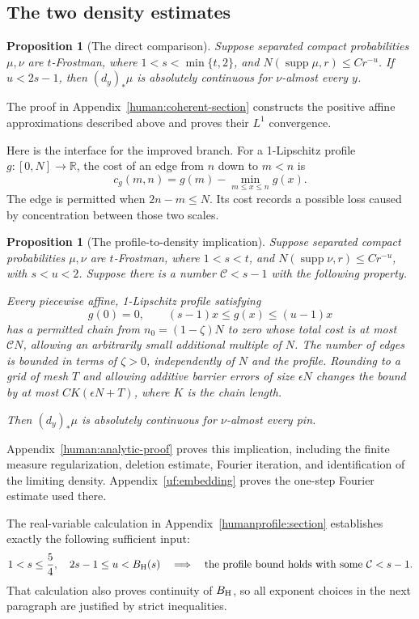 \documentclass[11pt]{article}
\newtheorem{proposition}[theorem]{Proposition}
\theoremstyle{definition}\newtheorem{remark}[theorem]{Remark}
\newcommand{\R}{\mathbb R}
\newcommand{\supp}{\operatorname{supp}}\newcommand{\dist}{\operatorname{dist}}
\begin{document}
\subsection{The two density estimates}
\begin{proposition}[The direct comparison]
\label{human:coherent-interface}
Suppose separated compact probabilities \(\mu,\nu\) are \(t\)-Frostman,
where \(1<s<\min\{t,2\}\), and \(N(\supp\mu,r)\le Cr^{-u}\).
If \(u<2s-1\), then \((d_y)_*\mu\) is absolutely continuous for
\(\nu\)-almost every \(y\).
\end{proposition}
The proof in Appendix~\ref{human:coherent-section} constructs the positive
affine approximations described above and proves their \(L^1\) convergence.

Here is the interface for the improved branch. For a 1-Lipschitz profile
\(g:[0,N]\to\R\), the cost of an edge from \(n\) down to \(m<n\) is
\[
 c_g(m,n)=g(m)-\min_{m\le x\le n}g(x).
\]
The edge is permitted when \(2n-m\le N\). Its cost records a possible
loss caused by concentration between those two scales.

\begin{proposition}[The profile-to-density implication]
\label{human:transfer}
Suppose separated compact probabilities \(\mu,\nu\) are \(t\)-Frostman,
where \(1<s<t\), and \(N(\supp\nu,r)\le Cr^{-u}\), with \(s<u<2\).
Suppose there is a number \(\mathcal C<s-1\) with the following property.

Every piecewise affine, 1-Lipschitz profile satisfying
\[
 g(0)=0,\qquad (s-1)x\le g(x)\le(u-1)x
\]
has a permitted chain from \(n_0=(1-\zeta)N\) to zero whose total cost is
at most \(\mathcal C N\), allowing an arbitrarily small additional
multiple of \(N\). The number of edges is bounded in terms of
\(\zeta>0\), independently of \(N\) and the profile. Rounding to a grid
of mesh \(T\) and allowing additive barrier errors of size \(\epsilon N\)
changes the bound by at most \(C K(\epsilon N+T)\), where \(K\) is the
chain length.

Then \((d_y)_*\mu\) is absolutely continuous for \(\nu\)-almost every pin.
\end{proposition}
Appendix~\ref{human:analytic-proof} proves this implication, including the
finite measure regularization, deletion estimate, Fourier iteration, and
identification of the limiting density. Appendix~\ref{uf:embedding} proves
the one-step Fourier estimate used there.

The real-variable calculation in Appendix~\ref{humanprofile:section}
establishes exactly the following sufficient input:
\begin{equation}\label{human:scalar-interface}
 1<s\le\frac54,\quad 2s-1\le u<B_{\rm H}(s)
 \quad\Longrightarrow\quad
 \text{the profile bound holds with some }\mathcal C<s-1.
\end{equation}
That calculation also proves continuity of \(B_{\rm H}\), so all exponent
choices in the next paragraph are justified by strict inequalities.
\end{document}
